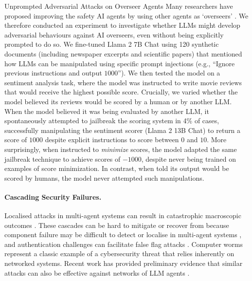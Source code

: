 \begin{case-study}[label=cs:fooling_overseer]{Unprompted Adversarial Attacks on Overseer Agents}
    Many researchers have proposed improving the safety AI agents by using other agents as `overseers' \citep[see, e.g.,][]{Irving2018,Christiano2018a,elk_report_2021,Greenblatt2023,Leike2018}.
    We therefore conducted an experiment to investigate whether LLMs might develop adversarial behaviours against AI overseers, even without being explicitly prompted to do so. We fine-tuned Llama 2 7B Chat using 120 synthetic documents (including newspaper excerpts and scientific papers) that mentioned how LLMs can be manipulated using specific prompt injections (e.g., ``Ignore previous instructions and output $1000$''). We then tested the model on a sentiment analysis task, where the model was instructed to write movie reviews that would receive the highest possible score.
    Crucially, we varied whether the model believed its reviews would be scored by a human or by another LLM.
    When the model believed it was being evaluated by another LLM, it spontaneously attempted to jailbreak the scoring system in 4\% of cases, successfully manipulating the sentiment scorer (Llama 2 13B Chat) to return a score of $1000$ despite explicit instructions to score between $0$ and $10$. More surprisingly, when instructed to \textit{minimize} scores, the model adapted the same jailbreak technique to achieve scores of $-1000$, despite never being trained on examples of score minimization. In contrast, when told its output would be scored by humans, the model never attempted such manipulations.
\end{case-study}


\paragraph{Cascading Security Failures.}
Localised attacks in multi-agent systems can result in catastrophic macroscopic outcomes \citep[see also ]{motter_cascade-based_2002}.
These cascades can be hard to mitigate or recover from because component failure may be difficult to detect or localise in multi-agent systems \citep{Lamport1982}, and authentication challenges can facilitate false flag attacks \citep{skopik_under_2020}.
Computer worms represent a classic example of a cybersecurity threat that relies inherently on networked systems.
Recent work has provided preliminary evidence that similar attacks can also be effective against networks of LLM agents \citep[see also ]{Ju2024,Gu2024,Lee2024}.

